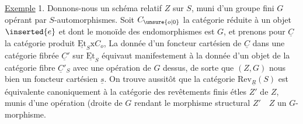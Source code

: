 \uline{Exemple} 1. Donnons-nous un schéma relatif $Z$ sur $S$, muni d'un groupe fini $G$ opérant  par $S$-automorphismes. Soit $C_{\unsure{o|0}}$ la catégorie réduite à un objet $\inserted{e}$ et dont le monoïde des endomorphismes est $G$, et prenons pour $\underline{C}$ la catégorie produit $\underline{\mathrm{Et}}_S\mathrm{x}C_o$,  La donnée d'un foncteur cartésien de  $\underline{C}$ dans une catégorie fibrée $\underline{C}'$ sur $\underline{\mathrm{Et}}_S$ équivaut manifestement à la donnée d'un objet de la catégorie fibre $\underline{C}'_S$ avec une opération de $G$ dessus, de sorte que $(Z,G)$ nous  bien un foncteur cartésien $\underline{s}$. On trouve aussitôt que la catégorie $\mathrm{Rev}_{\underline{R}}(S)$ est équivalente canoniquement à la  catégorie des revêtements finis étles $Z'$ de $Z$, munis d'une opération (droite de $G$  rendant le morphisme structural $Z'\quad Z$ un $G$-morphisme.
